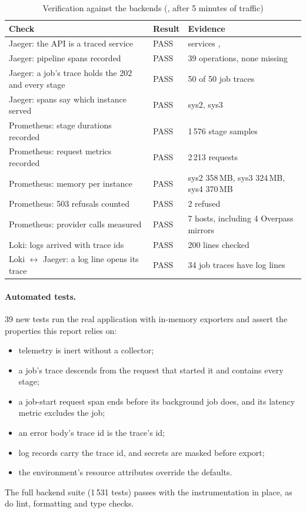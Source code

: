 \documentclass[11pt,a4paper]{article}
\newcommand{\codett}[1]{\texttt{\detokenize{#1}}}
\begin{document}
\begin{table}[!htb]
  \caption{Verification against the backends (\codett{telemetry_demo.py}, after 5 minutes of traffic)}
  \label{tab:checks}
  \small
  \begin{tabular}{L{6.9cm}L{1.2cm}L{7.2cm}}
    \toprule
    Check & Result & Evidence \\
    \midrule
    Jaeger: the API is a traced service & PASS & services ,  \\
    Jaeger: pipeline spans recorded & PASS & 39 operations, none missing \\
    Jaeger: a job's trace holds the 202 and every stage & PASS & 50 of 50 job traces \\
    Jaeger: spans say which instance served & PASS & sys2, sys3 \\
    Prometheus: stage durations recorded & PASS & 1\,576 stage samples \\
    Prometheus: request metrics recorded & PASS & 2\,213 requests \\
    Prometheus: memory per instance & PASS & sys2 358\,MB, sys3 324\,MB, sys4 370\,MB \\
    Prometheus: 503 refusals counted & PASS & 2 refused \\
    Prometheus: provider calls measured & PASS & 7 hosts, including 4 Overpass mirrors \\
    Loki: logs arrived with trace ids & PASS & 200 lines checked \\
    Loki $\leftrightarrow$ Jaeger: a log line opens its trace & PASS & 34 job traces have log lines \\
    \bottomrule
  \end{tabular}
\end{table}

\paragraph{Automated tests.}
39 new tests run the real application with in-memory exporters and assert the properties this
report relies on:
\begin{itemize}
  \item telemetry is inert without a collector;
  \item a job's trace descends from the request that started it and contains every stage;
  \item a job-start request span ends before its background job does, and its latency metric
    excludes the job;
  \item an error body's trace id is the trace's id;
  \item log records carry the trace id, and secrets are masked before export;
  \item the environment's resource attributes override the defaults.
\end{itemize}
The full backend suite (1\,531 tests) passes with the instrumentation in place, as do lint,
formatting and type checks.
\end{document}

